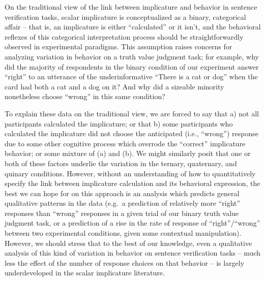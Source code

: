 \documentclass[man]{apa6}
\theoremstyle{definition}
\theoremstyle{definition}
\theoremstyle{definition}
\theoremstyle{remark}
\begin{document}
On the traditional view of the link between implicature and behavior in
sentence verification tasks, scalar implicature is conceptualized as a
binary, categorical affair -- that is, an implicature is either
\enquote{calculated} or it isn't, and the behavioral reflexes of this
categorical interpretation process should be straightforwardly observed
in experimental paradigms. This assumption raises concerns for analyzing
variation in behavior on a truth value judgment task; for example, why
did the majority of respondents in the binary condition of our
experiment answer \enquote{right} to an utterance of the
underinformative \enquote{There is a cat or dog} when the card had both
a cat and a dog on it? And why did a sizeable minority nonetheless
choose \enquote{wrong} in this same condition?

To explain these data on the traditional view, we are forced to say that
a) not all participants calculated the implicature; or that b) some
participants who calculated the implicature did not choose the
anticipated (i.e., \enquote{wrong}) response due to some other cognitive
process which overrode the \enquote{correct} implicature behavior; or
some mixture of (a) and (b). We might similarly posit that one or both
of these factors underlie the variation in the ternary, quaternary, and
quinary conditions. However, without an understanding of how to
quantitatively specify the link between implicature calculation and its
behavioral expression, the best we can hope for on this approach is an
analysis which predicts general qualitative patterns in the data (e.g.~a
prediction of relatively more \enquote{right} responses than
\enquote{wrong} responses in a given trial of our binary truth value
judgment task, or a prediction of a rise in the rate of response of
\enquote{right}/\enquote{wrong} between two experimental conditions,
given some contextual manipulation). However, we should stress that to
the best of our knowledge, even a qualitative analysis of this kind of
variation in behavior on sentence verification tasks -- much less the
effect of the number of response choices on that behavior -- is largely
underdeveloped in the scalar implicature literature.
\end{document}
